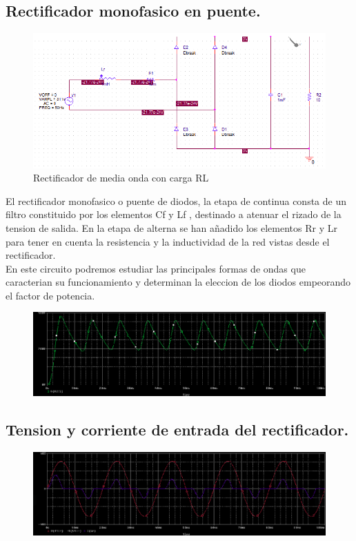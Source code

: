 \documentclass[11pt,a4paper]{article}
\begin{document}
\subsection{Rectificador monofasico en puente.}

\begin{figure}[h]
\centering
\includegraphics[scale=.4]{5.png}  
\caption{Rectificador de media onda con carga RL}
\end{figure}


El rectificador monofasico o puente de diodos, la etapa de continua consta de un filtro constituido por los elementos Cf y Lf , destinado a atenuar el rizado de la tension de salida. En la etapa de alterna se han añadido los elementos Rr y Lr para tener en cuenta la resistencia y la inductividad de la red vistas desde el rectificador.\\
En este circuito podremos estudiar las principales formas de ondas que caracterian su funcionamiento y determinan la eleccion de los diodos empeorando el factor de potencia.

\begin{figure}[h]
\centering
\includegraphics[scale=.15]{6.png} 
\end{figure}

\subsection{Tension y corriente de entrada del rectificador.}

\begin{figure}[h]
\centering
\includegraphics[scale=.5]{7.png} 
\end{figure}
\end{document}
